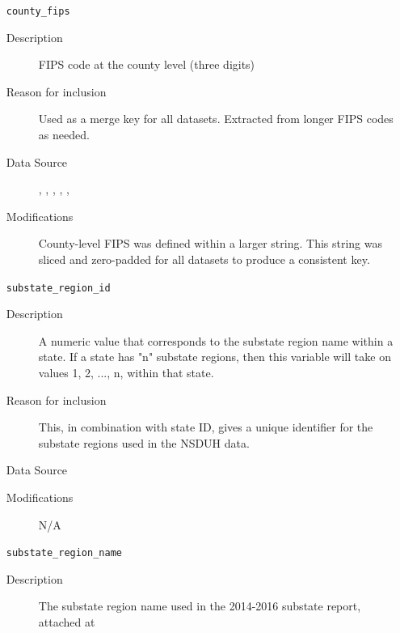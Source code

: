 \documentclass{article}
\begin{document}
\begin{itemize}[label={}, align=left]
    \item[\texttt{county\_fips}] \
          \begin{description}
              \item[Description] FIPS code at the county level (three digits)
              \item[Reason for inclusion] Used as a merge key for all datasets.
                    Extracted from longer FIPS codes as needed. \\
              \item[Data Source]
                    \cite{acs_demographics_data},
                    \cite{acs_poverty_data},
                    \cite{acs_income_data},
                    \cite{acs_marital_data},
                    \cite{acs_education_data},
                    \cite{samhsa_data} \\
              \item[Modifications] County-level FIPS was defined within a
                    larger string. This string was sliced and zero-padded for all
                    datasets to produce a consistent key. \\
          \end{description}
    \item[\texttt{substate\_region\_id}] \
          \begin{description}
              \item[Description] A numeric value that corresponds to the
                    substate region name within a state. If a state has "n"
                    substate regions, then this variable will take on values 1,
                    2, ..., n, within that state.
              \item[Reason for inclusion] This, in combination with state ID,
                    gives a unique identifier for the substate regions used in the
                    NSDUH data.
              \item[Data Source] \cite{samhsa_substate_region_defs}
              \item[Modifications] N/A
          \end{description}
    \item[\texttt{substate\_region\_name}] \
          \begin{description}
              \item[Description] The substate region name used in the 2014-2016
                    substate report, attached at


\end{description}
\end{itemize}
\end{document}
